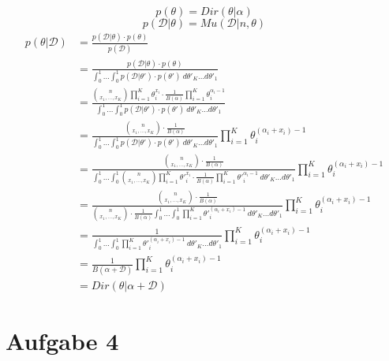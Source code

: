 \documentclass[10pt,a4paper]{article}
\begin{document}
\begin{equation}
  p(\theta) = Dir(\theta | \alpha)
\end{equation}
\begin{equation}
  p(\mathcal{D} | \theta) = Mu(\mathcal{D} | n, \theta)
\end{equation}
\begin{align*}
  p(\theta | \mathcal{D}) & = \frac{p(\mathcal{D} | \theta) \cdot p(\theta)}{p(\mathcal{D})}\\
  & = \frac{p(\mathcal{D} | \theta) \cdot p(\theta)}{\int_{0}^{1} \dots \int_{0}^{1} p(\mathcal{D} | \theta') \cdot p(\theta')\ d\theta'_{K} \dots d\theta'_{1}}\\
  & = \frac{\binom{n}{x_{1}, \dots, x_{K}} \prod_{i = 1}^{K} \theta_{i}^{x_{i}} \cdot \frac{1}{B(\alpha)}\prod_{i = 1}^{K} \theta_{i}^{\alpha_{i} - 1}}{\int_{0}^{1} \dots \int_{0}^{1} p(\mathcal{D} | \theta') \cdot p(\theta')\ d\theta'_{K} \dots d\theta'_{1}}\\
  & = \frac{\binom{n}{x_{1}, \dots, x_{K}} \cdot \frac{1}{B(\alpha)}}{\int_{0}^{1} \dots \int_{0}^{1} p(\mathcal{D} | \theta') \cdot p(\theta')\ d\theta'_{K} \dots d\theta'_{1}} \prod_{i = 1}^{K} \theta_{i}^{(\alpha_{i} + x_{i}) - 1}\\
  & = \frac{\binom{n}{x_{1}, \dots, x_{K}} \cdot \frac{1}{B(\alpha)}}{\int_{0}^{1} \dots \int_{0}^{1} \binom{n}{x_{1}, \dots, x_{K}} \prod_{i = 1}^{K} \theta'^{x_{i}}_{i} \cdot \frac{1}{B(\alpha)} \prod_{i = 1}^{K} \theta'^{\alpha_{i} - 1}_{i}\ d\theta'_{K} \dots d\theta'_{1}} \prod_{i = 1}^{K} \theta_{i}^{(\alpha_{i} + x_{i}) - 1}\\
  & = \frac{\binom{n}{x_{1}, \dots, x_{K}} \cdot \frac{1}{B(\alpha)}}{\binom{n}{x_{1}, \dots, x_{K}} \cdot \frac{1}{B(\alpha)} \int_{0}^{1} \dots \int_{0}^{1}\prod_{i = 1}^{K} \theta'^{(\alpha_{i} + x_{i}) - 1}_{i}\ d\theta'_{K} \dots d\theta'_{1}} \prod_{i = 1}^{K} \theta_{i}^{(\alpha_{i} + x_{i}) - 1}\\
  & = \frac{1}{\int_{0}^{1} \dots \int_{0}^{1} \prod_{i = 1}^{K} \theta'^{(\alpha_{i} + x_{i}) - 1}_{i}\ d\theta'_{K} \dots d\theta'_{1}} \prod_{i = 1}^{K} \theta_{i}^{(\alpha_{i} + x_{i}) - 1}\\
  & = \frac{1}{B(\alpha + \mathcal{D})} \prod_{i = 1}^{K} \theta_{i}^{(\alpha_{i} + x_{i}) - 1}\\
  & = Dir(\theta | \alpha + \mathcal{D})
\end{align*}

\section{Aufgabe 4}
\end{document}
